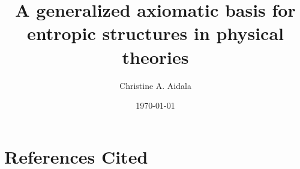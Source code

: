 \documentclass[letterpaper,12pt,prl,tightenlines,onecolumn,notitlepage,longbibliography,floatfix,nofootinbib]{revtex4-2}
\begin{document}
%
%
\title{A generalized axiomatic basis for entropic structures in physical theories}
\date{\today}
\author{Christine A. Aidala}
\maketitle
\newpage
{}

\newpage
\setcounter{page}{0}

\cleardoublepage
%
\cleardoublepage
%
\cleardoublepage
\section{References Cited}

\cleardoublepage
%
%
\end{document}
